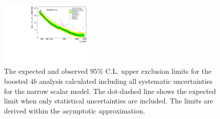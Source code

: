 \begin{figure}
\begin{center}
\includegraphics[width=0.4\textwidth,angle=-90]{figures/boosted/results/BrazilPlot_Asymptotic_s_hh_combined_AllSyst_unblinded_2017-10-04.pdf}
\caption{The expected and observed 95\% C.L. upper exclusion limits for the boosted $4b$ analysis calculated including all systematic uncertainties for the narrow scalar model. The dot-dashed line shows the expected limit when only statistical uncertainties are included. The limits are derived within the asymptotic approximation.}
\label{fig:limit_g10}
\end{center}
\end{figure}

